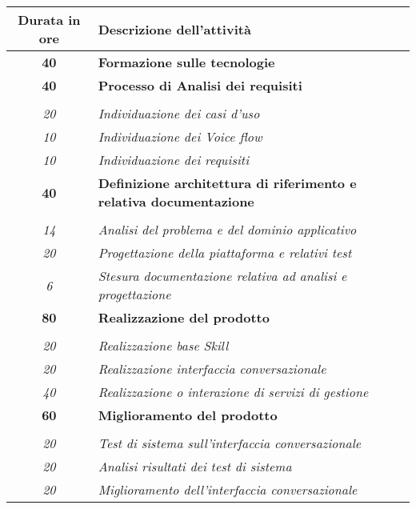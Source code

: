 

\begin{tabularx}{\textwidth}{|c|X|}
	\hline
	\textbf{Durata in ore} & \textbf{Descrizione dell'attività} \\\hline

	\textbf{40} & \textbf{Formazione sulle tecnologie} \\	
	\hline   
	\textbf{40} & \textbf{Processo di Analisi dei requisiti} \\ \hdashline 
	\multirow{3}{0cm}\\ 
	\textit{20} & 
	\textit{Individuazione dei casi d'uso} \\
	\textit{10} & 
	\textit{Individuazione dei Voice flow} \\
	\textit{10} & 
	\textit{Individuazione dei requisiti} \\
	\hline
	
    \textbf{40} & \textbf{Definizione architettura di riferimento e relativa documentazione} \\ \hdashline 
    \multirow{3}{0cm}\\ 
    \textit{14} & 
    \textit{Analisi del problema e del dominio applicativo} \\
    \textit{20} & 
    \textit{Progettazione della piattaforma e relativi test} \\
    \textit{6} & 
    \textit{Stesura documentazione relativa ad analisi e progettazione} \\
    \hline
    
   \textbf{80} & \textbf{Realizzazione del prodotto} \\	\hdashline
   \multirow{3}{0cm}\\ 
   \textit{20} & 
   \textit{Realizzazione base Skill} \\
   \textit{20} & 
   \textit{Realizzazione interfaccia conversazionale} \\
   \textit{40} & 
   \textit{Realizzazione o interazione di servizi di gestione} \\
   \hline
    
    \textbf{60} & \textbf{Miglioramento del prodotto} \\	\hdashline
    \multirow{3}{0cm}\\ 
    \textit{20} & 
    \textit{Test di sistema sull'interfaccia conversazionale} \\
    \textit{20} & 
    \textit{Analisi risultati dei test di sistema} \\
    \textit{20} & 
    \textit{Miglioramento dell'interfaccia conversazionale } \\
    \hline
    

\end{tabularx}
